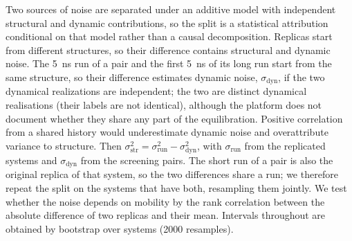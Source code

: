 \documentclass[preprint,12pt]{elsarticle}
\begin{document}
Two sources of noise are separated under an additive model with independent structural and
dynamic contributions, so the split is a statistical attribution conditional on that model rather
than a causal decomposition. Replicas start from different structures, so their difference
contains structural and dynamic noise. The \SI{5}{\nano\second} run of a pair and the
first \SI{5}{\nano\second} of its long run start from the same structure, so their difference
estimates dynamic noise, $\sigma_{\mathrm{dyn}}$, if the two dynamical realizations are independent; the two are distinct dynamical realisations
(their labels are not identical), although the platform does not document whether they share any
part of the equilibration. Positive correlation from a shared history would underestimate dynamic
noise and overattribute variance to structure. Then
$\sigma_{\mathrm{str}}^2=\sigma_{\mathrm{run}}^2-\sigma_{\mathrm{dyn}}^2$, with $\sigma_{\mathrm{run}}$ from the
\nRep{} replicated systems and $\sigma_{\mathrm{dyn}}$ from the \techoEndDynN{} screening pairs. The short
run of a pair is also the original replica of that system, so the two differences share a run; we
therefore repeat the split on the \techoEndJointN{} systems that have both, resampling them jointly. We test whether the noise
depends on mobility by the rank correlation between the absolute difference of two replicas and
their mean. Intervals throughout are obtained by bootstrap over systems (2000 resamples).
\end{document}
